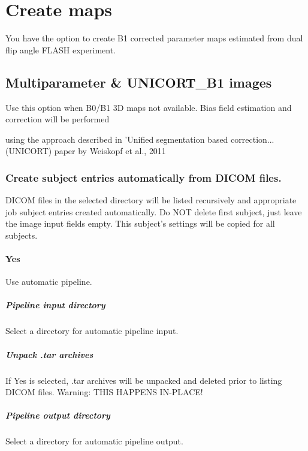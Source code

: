 
\chapter{Create maps  \label{Chap:crt_maps}}

\vskip 1.5cm

You have the option to create B1 corrected parameter maps estimated from dual flip angle FLASH experiment.


\section{Multiparameter \& UNICORT\_B1 images}
Use this option when B0/B1 3D maps not available. Bias field estimation and correction will be performed

using the approach described in 'Unified segmentation based correction... (UNICORT) paper by Weiskopf et al., 2011 


\subsection{Create subject entries automatically from DICOM files.}
DICOM files in the selected directory will be listed recursively and appropriate job subject entries created automatically. Do NOT delete first subject, just leave the image input fields empty. This subject's settings will be copied for all subjects.


\subsubsection{Yes}
Use automatic pipeline.


\paragraph{Pipeline input directory}
Select a directory for automatic pipeline input.


\paragraph{Unpack .tar archives}
If Yes is selected, .tar archives will be unpacked and deleted prior to listing DICOM files. Warning: THIS HAPPENS IN-PLACE!


\paragraph{Pipeline output directory}
Select a directory for automatic pipeline output.


